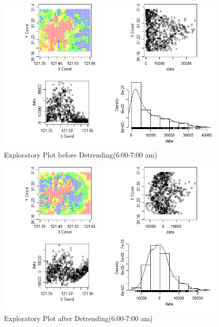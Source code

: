 \documentclass[hidelinks,12pt]{article}
\begin{document}
\begin{figure}[!ht]
		\includegraphics[width=\textwidth]{geo6.png}
		\caption{Exploratory Plot before Detrending(6:00-7:00 am) \label{fig:geo6}}
\end{figure}
\FloatBarrier

\begin{figure}[!ht]
		\includegraphics[width=\textwidth]{gres6.png}
		\caption{Exploratory Plot after Detrending(6:00-7:00 am)\label{fig:gres6}}
\end{figure}
\FloatBarrier
\end{document}
